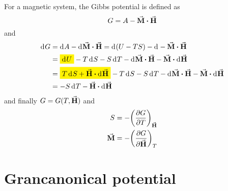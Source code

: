 \documentclass[../main/main.tex]{subfiles}
\begin{document}
For a magnetic system, the Gibbs potential is defined as
\begin{equation}
  G = A - \va{M} \vdot \va{H}
  \label{eq:}
\end{equation}
and
\begin{equation}
\begin{split}
\dd[]{G} &= \dd[]{A} - \dd[]{\va{M} \vdot \va{H}  }  = \dd[]{(U-T S)} - \dd[]{-\va{M} \vdot \va{H}  } \\
  & = \mathcolorbox{yellow}{\dd[]{U} } - T \dd[]{S} - S \dd[]{T} - \dd[]{\va{M} } \vdot \va{H} - \va{M} \vdot \dd[]{\va{H} }  \\
& = \mathcolorbox{yellow}{T \dd[]{S} + \va{H} \vdot \dd[]{\va{H} }} - T \dd[]{S} - S \dd[]{T} - \dd[]{\va{M} } \vdot \va{H} - \va{M} \vdot \dd[]{\va{H} } \\
 & = - S \dd[]{T} - \va{H}\vdot \dd[]{\va{H} }
\end{split}
  \label{eq:}
\end{equation}
and finally \( G=G(T,\va{H} ) \) and
\begin{subequations}
\begin{align}
  S &= - \qty(\pdv{G}{T} )_{\va{H} } \\
  \va{M}  &= - \qty(\pdv{G}{ \va{H} } )_{T}
\end{align}
\label{}
\end{subequations}

\section{Grancanonical potential}
\end{document}
